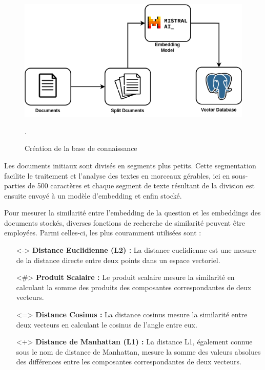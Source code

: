 \begin{figure}[H]
    \centering
    \includegraphics[width=12cm]{gfx/fig-knowledge-base.png}
    \caption{Création de la base de connaissance}.
    \label{fig:knowledge-base}
\end{figure}

Les documents initiaux sont divisés en segments plus petits. Cette segmentation facilite le traitement et l'analyse des textes en morceaux gérables, ici en sous-parties de 500 caractères et chaque segment de texte résultant de la division est ensuite envoyé à un modèle d'embedding et enfin stocké. 

Pour mesurer la similarité entre l'embedding de la question et les embeddings des documents stockés, diverses fonctions de recherche de similarité peuvent être employées. Parmi celles-ci, les plus couramment utilisées sont :

\begin{itemize}
    \item[<->] \textbf{Distance Euclidienne (L2)  : } 
    La distance euclidienne est une mesure de la distance directe entre deux points dans un espace vectoriel.
    
    \item[<\#>] \textbf{Produit Scalaire  :} 
    Le produit scalaire mesure la similarité en calculant la somme des produits des composantes correspondantes de deux vecteurs.
    
    \item[<=>] \textbf{Distance Cosinus :}
    La distance cosinus mesure la similarité entre deux vecteurs en calculant le cosinus de l'angle entre eux.
    
    \item[<+>] \textbf{Distance de Manhattan (L1) :}
    La distance L1, également connue sous le nom de distance de Manhattan, mesure la somme des valeurs absolues des différences entre les composantes correspondantes de deux vecteurs.
\end{itemize}

